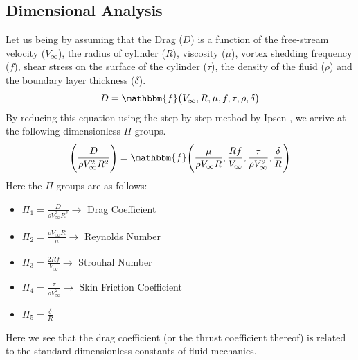 \subsection{Dimensional Analysis}
Let us being by assuming that the Drag ($D$) is a function of the free-stream velocity ($V_{\infty}$), the radius of cylinder ($R$), viscosity ($\mu$), vortex shedding frequency ($f$), shear stress on the surface of the cylinder ($\tau$), the density of the fluid ($\rho$) and the boundary layer thickness ($\delta$).
\begin{equation}
	D = \mathbbm{f} \big( V_{\infty}, R, \mu, f, \tau, \rho, \delta \big)
\end{equation}
By reducing this equation using the step-by-step method by Ipsen \parencite{ipsen1960units}, we arrive at the following dimensionless $\Pi$ groups.
\begin{equation}
	\Bigg( \frac{D}{\rho V_{\infty}^2 R^2} \Bigg) = \mathbbm{f} \Bigg( \frac{\mu}{\rho V_{\infty} R}, \frac{R f}{V_{\infty}}, \frac{\tau}{\rho V_{\infty}^2}, \frac{\delta}{R} \Bigg)
\end{equation}
Here the $\Pi$ groups are as follows:
\begin{itemize}
	\item $\Pi_1 = \frac{D}{\rho V_{\infty}^2 R^2} \rightarrow$ Drag Coefficient
	\item $\Pi_2 = \frac{\rho V_{\infty} R}{\mu} \rightarrow$ Reynolds Number
	\item $\Pi_3 = \frac{2 R f}{V_{\infty}} \rightarrow$ Strouhal Number
	\item $\Pi_4 = \frac{\tau}{\rho V_{\infty}^2} \rightarrow$ Skin Friction Coefficient
	\item $\Pi_5 = \frac{\delta}{R}$
\end{itemize}
Here we see that the drag coefficient (or the thrust coefficient thereof) is related to the standard dimensionless constants of fluid mechanics.

